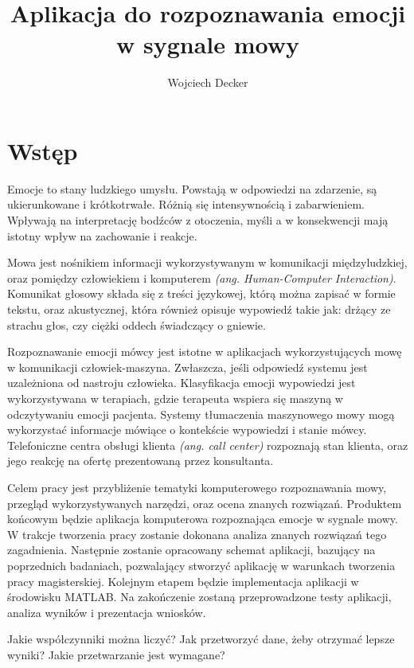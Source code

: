 \documentclass[a4paper,12pt,twoside,openany]{report}
\title{Aplikacja do rozpoznawania emocji w sygnale mowy}
\author{Wojciech Decker}
\newcommand*\NewPage{\newpage\null\thispagestyle{empty}\newpage}
\newcommand{\ang}[1]{\textit{(ang. #1)}}
\begin{document}
\maketitle
\chapter{Wstęp}
\label{ch:wstep}
Emocje to stany ludzkiego umysłu.
Powstają w odpowiedzi na zdarzenie, są ukierunkowane i krótkotrwałe.
Różnią się intensywnością i zabarwieniem.
Wpływają na interpretację bodźców z otoczenia,
myśli a w konsekwencji mają istotny wpływ na zachowanie i reakcje.

Mowa jest nośnikiem informacji wykorzystywanym w komunikacji międzyludzkiej,
oraz pomiędzy człowiekiem i komputerem \ang{Human-Computer Interaction}.
Komunikat głosowy składa się z treści językowej,
którą można zapisać w formie tekstu,
oraz akustycznej, która również opisuje wypowiedź takie jak:
drżący ze strachu głos, czy ciężki oddech świadczący o gniewie.

Rozpoznawanie emocji mówcy jest istotne w aplikacjach wykorzystujących mowę w komunikacji człowiek-maszyna.
Zwłaszcza, jeśli odpowiedź systemu jest uzależniona od nastroju człowieka.
Klasyfikacja emocji wypowiedzi jest wykorzystywana w terapiach,
gdzie terapeuta wspiera się maszyną w odczytywaniu emocji pacjenta.
Systemy tłumaczenia maszynowego mowy mogą wykorzystać informacje mówiące o kontekście wypowiedzi i stanie mówcy.
Telefoniczne centra obsługi klienta \ang{call center} rozpoznają stan klienta,
oraz jego reakcję na ofertę prezentowaną przez konsultanta.

Celem pracy jest przybliżenie tematyki komputerowego rozpoznawania mowy,
przegląd wykorzystywanych narzędzi, oraz ocena znanych rozwiązań.
Produktem końcowym będzie aplikacja komputerowa rozpoznająca emocje w sygnale mowy.
W trakcje tworzenia pracy zostanie dokonana analiza znanych rozwiązań tego zagadnienia.
Następnie zostanie opracowany schemat aplikacji, bazujący na poprzednich badaniach,
pozwalający stworzyć aplikację w warunkach tworzenia pracy magisterskiej.
Kolejnym etapem będzie implementacja aplikacji w środowisku MATLAB.
Na zakończenie zostaną przeprowadzone testy aplikacji,
analiza wyników i prezentacja wniosków.

Jakie współczynniki można liczyć? 
Jak przetworzyć dane, żeby otrzymać lepsze wyniki?
Jakie przetwarzanie jest wymagane?
\NewPage
\end{document}
